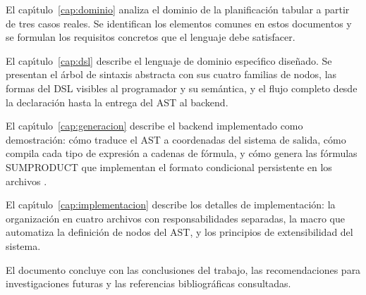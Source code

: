 El cap\'{\i}tulo~\ref{cap:dominio} analiza el dominio de la planificaci\'on
tabular a partir de tres casos reales.  Se identifican los elementos comunes
en estos documentos y se formulan los requisitos concretos que el lenguaje debe
satisfacer.

El cap\'{\i}tulo~\ref{cap:dsl} describe el lenguaje de dominio espec\'{\i}fico
dise\~nado.  Se presentan el \'arbol de sintaxis abstracta con sus cuatro
familias de nodos, las formas del DSL visibles al programador y su sem\'antica,
y el flujo completo desde la declaraci\'on hasta la entrega del AST al backend.

El cap\'{\i}tulo~\ref{cap:generacion} describe el backend implementado como
demostraci\'on: c\'omo traduce el AST a coordenadas del sistema de salida,
c\'omo compila cada tipo de expresi\'on a cadenas de f\'ormula, y c\'omo
genera las f\'ormulas SUMPRODUCT que implementan el formato condicional
persistente en los archivos \xlsx{}.

El cap\'{\i}tulo~\ref{cap:implementacion} describe los detalles de implementaci\'on:
la organizaci\'on en cuatro archivos con responsabilidades separadas, la macro
 que automatiza la definici\'on de nodos del AST, y los
principios de extensibilidad del sistema.

El documento concluye con las conclusiones del trabajo, las recomendaciones
para investigaciones futuras y las referencias bibliogr\'aficas consultadas.
